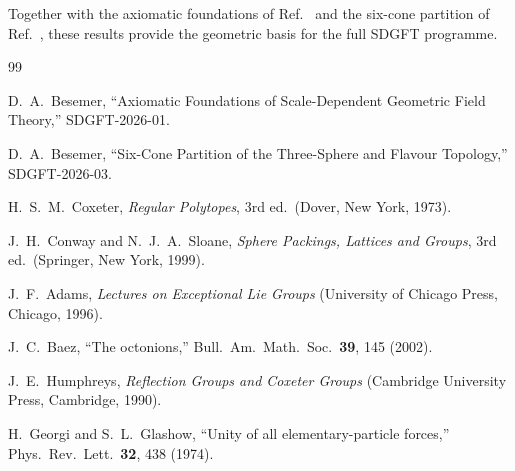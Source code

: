 \documentclass[amsmath,amssymb,aps,prd,twocolumn,superscriptaddress,nofootinbib]{revtex4-2}
\begin{document}
Together with the axiomatic foundations of Ref.~\cite{Besemer2026_01} and the
six-cone partition of Ref.~\cite{Besemer2026_03}, these results provide the
geometric basis for the full SDGFT programme.

\begin{thebibliography}{99}

D.~A.~Besemer,
``Axiomatic Foundations of Scale-Dependent Geometric Field Theory,''
SDGFT-2026-01.

D.~A.~Besemer,
``Six-Cone Partition of the Three-Sphere and Flavour Topology,''
SDGFT-2026-03.

H.~S.~M.~Coxeter,
\emph{Regular Polytopes}, 3rd ed.\ (Dover, New York, 1973).

J.~H.~Conway and N.~J.~A.~Sloane,
\emph{Sphere Packings, Lattices and Groups}, 3rd ed.\
(Springer, New York, 1999).

J.~F.~Adams,
\emph{Lectures on Exceptional Lie Groups}
(University of Chicago Press, Chicago, 1996).

J.~C.~Baez,
``The octonions,''
Bull.\ Am.\ Math.\ Soc.\ \textbf{39}, 145 (2002).

J.~E.~Humphreys,
\emph{Reflection Groups and Coxeter Groups}
(Cambridge University Press, Cambridge, 1990).

H.~Georgi and S.~L.~Glashow,
``Unity of all elementary-particle forces,''
Phys.\ Rev.\ Lett.\ \textbf{32}, 438 (1974).

\end{thebibliography}
\end{document}
